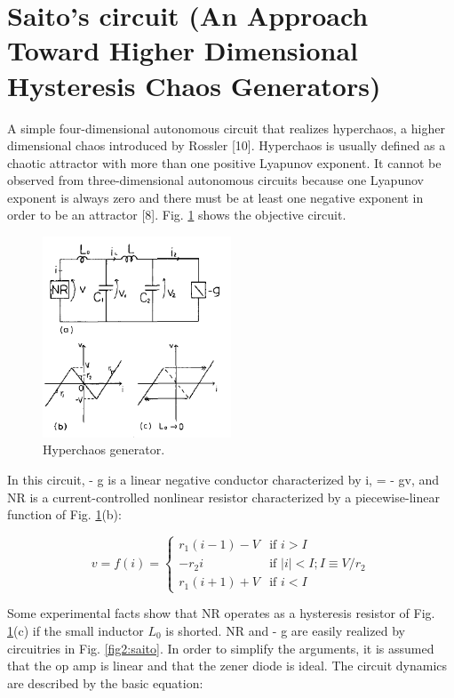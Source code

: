\documentclass[%
 reprint,
 amsmath,amssymb,
 aps,
]{revtex4-2}
\begin{document}

\section{Saito's circuit (An Approach Toward Higher Dimensional Hysteresis Chaos Generators)}

A simple four-dimensional autonomous circuit that realizes hyperchaos, a higher dimensional chaos introduced by Rossler [10]. Hyperchaos is usually defined as a chaotic attractor with more than one positive Lyapunov exponent. It cannot be observed from three-dimensional autonomous circuits because one Lyapunov exponent is always zero and there must be at least one negative exponent in order to be an attractor [8]. Fig. \ref{fig1:saito} shows the objective circuit.
\begin{figure}
    \centering
    \includegraphics[width=0.5\textwidth]{Saito/fig. 1 Saito.png}
    \caption{Hyperchaos generator.}
    \label{fig1:saito}
\end{figure}
In this circuit, - g is a linear negative conductor characterized by i, = - gv, and NR is a current-controlled nonlinear resistor characterized by a piecewise-linear function of Fig. \ref{fig1:saito}(b):

\begin{equation}
    v= f(i) =
        \left\{
        	\begin{array}{ll}
        		r_{1}(i-1)-V & \mbox{if } i > I \\ %
        		-r_{2}i & \mbox{if } |i| < I; I \equiv V/r_{2}\\
                r_{1}(i+1)+V & \mbox{if } i < I 
        	\end{array}
        \right.
\end{equation}

Some experimental facts show that NR operates as a hysteresis resistor of Fig. \ref{fig1:saito}(c) if the small inductor $L_0$ is shorted. NR and - g are easily realized by circuitries in Fig. \ref{fig2:saito}. In order to simplify the arguments, it is assumed that the op amp is linear and that the zener diode is ideal. The circuit dynamics are described by the basic equation:
\end{document}
